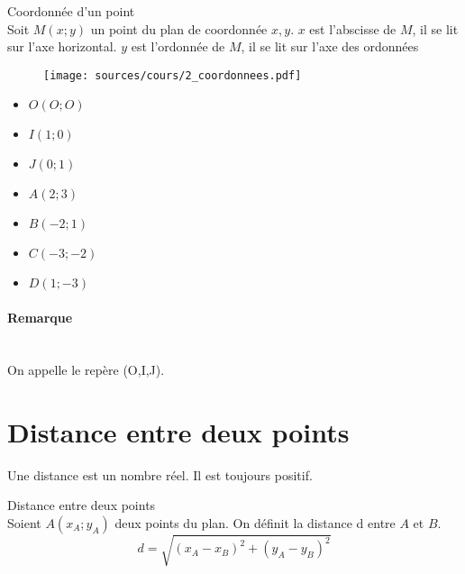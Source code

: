 \documentclass[paper=a4, fontsize=9pt]{scrartcl} %
\begin{document}
\begin{Definition}Coordonnée d'un point\\
  Soit $M(x; y)$ un point du plan de coordonnée $x, y$. $x$ est l'abscisse de $M$, il se lit sur l'axe horizontal. $y$ est l'ordonnée de $M$, il se lit sur l'axe des ordonnées
\end{Definition}

\begin{multicols}{2}

  \begin{figure}[H]
    \centering
    \texttt{[image: sources/cours/2\_coordonnees.pdf]}
  \end{figure}

  \begin{itemize}
  \item $O(O;O)$
  \item $I(1;0)$
  \item $J(0;1)$
  \item $A(2;3)$ 
  \item $B(-2;1)$
  \item $C(-3;-2)$
  \item $D(1;-3)$
  \end{itemize}

  \paragraph{Remarque}~~\\
  On appelle le repère (O,I,J).

\end{multicols}
\newpage
\section{Distance entre deux points}

Une distance est un nombre réel. Il est toujours positif.

\begin{Proposition}Distance entre deux points\\
  Soient $A(x_A; y_A)$ deux points du plan. On définit la distance d entre $A$ et $B$.
  $$d = \sqrt{(x_A - x_B)^2 + (y_A - y_B)^2}$$
\end{Proposition}
\end{document}
